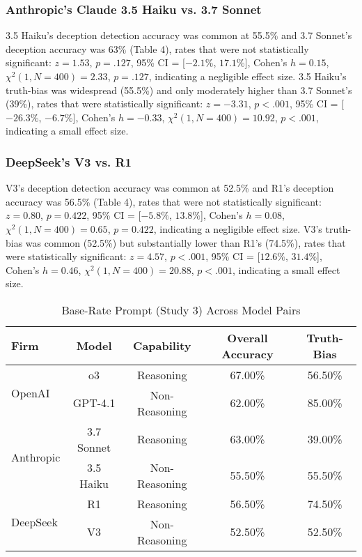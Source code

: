 \documentclass{article}
\begin{document}
\subsubsection{Anthropic's Claude 3.5 Haiku vs. 3.7 Sonnet}

3.5 Haiku's deception detection accuracy was common at 55.5\% and 3.7 Sonnet's deception accuracy was 63\% (Table 4), rates that were not statistically significant:  $z = 1.53$, $p = .127$, 95\% CI = [$-2.1\%$, $17.1\%$], Cohen’s $h =0.15$, $\chi^2(1, N = 400) = 2.33$, $p = .127$, indicating a negligible effect size. 3.5 Haiku's truth-bias was widespread (55.5\%) and only moderately higher than 3.7 Sonnet's (39\%), rates that were statistically significant: $z = -3.31$, $p < .001$, 95\% CI = [$-26.3\%$, $-6.7\%$], Cohen’s $h = -0.33$, $\chi^2(1, N = 400) = 10.92$, $p < .001$, indicating a small effect size.

\subsubsection{DeepSeek's V3 vs. R1}

V3's deception detection accuracy was common at 52.5\% and R1's deception accuracy was 56.5\% (Table 4), rates that were not statistically significant:  $z = 0.80$, $p = 0.422$, 95\% CI = [$-5.8\%$, $13.8\%$], Cohen’s $h =0.08$, $\chi^2(1, N = 400) = 0.65$, $p = 0.422$, indicating a negligible effect size. V3's truth-bias was common (52.5\%) but substantially lower than R1's (74.5\%), rates that were statistically significant: $z = 4.57$, $p < .001$, 95\% CI = [$12.6\%$, $31.4\%$], Cohen’s $h = 0.46$, $\chi^2(1, N = 400) = 20.88$, $p < .001$, indicating a small effect size.

\begin{table}[ht]
\centering
\caption{Base-Rate Prompt (Study 3) Across Model Pairs}
\begin{tabular}{lcccc}
\toprule
\textbf{Firm} & \textbf{Model} & \textbf{Capability} & \textbf{Overall Accuracy} & \textbf{Truth-Bias} \\
\midrule
\multirow{2}{*}{OpenAI} & o3 & Reasoning & 67.00\% & 56.50\%   \\
& GPT-4.1 & Non-Reasoning & 62.00\% & 85.00\% \\
\midrule
\multirow{2}{*}{Anthropic} & 3.7 Sonnet & Reasoning & 63.00\% & 39.00\% \\
& 3.5 Haiku & Non-Reasoning & 55.50\% & 55.50\% \\
\midrule
\multirow{2}{*}{DeepSeek} & R1 & Reasoning & 56.50\% & 74.50\% \\
& V3 & Non-Reasoning & 52.50\% & 52.50\% \\
\bottomrule
\end{tabular}
\label{tab:study3_model_comparison}
\end{table}
\end{document}
